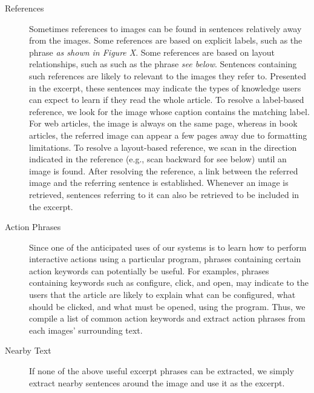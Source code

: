 \documentclass{www2010-submission}
\begin{document}
\begin{description}
\item[References] Sometimes references to images can be found in
  sentences relatively away from the images. Some references are based
  on explicit labels, such as the phrase \emph{as shown in Figure
    X}. Some references are based on layout relationships, such as
  such as the phrase \emph{see below}. Sentences containing such
  references are likely to relevant to the images they refer
  to. Presented in the excerpt, these sentences may indicate the types
  of knowledge users can expect to learn if they read the whole
  article. To resolve a label-based reference, we look for the image
  whose caption contains the matching label. For web articles, the
  image is always on the same page, whereas in book articles, the
  referred image can appear a few pages away due to formatting
  limitations. To resolve a layout-based reference, we scan in the
  direction indicated in the reference (e.g., scan backward for see
  below) until an image is found. After resolving the reference, a
  link between the referred image and the referring sentence is
  established. Whenever an image is retrieved, sentences referring to
  it can also be retrieved to be included in the excerpt.

\item[Action Phrases] Since one of the anticipated uses of our systems
  is to learn how to perform interactive actions using a particular
  program, phrases containing certain action keywords can potentially
  be useful. For examples, phrases containing keywords such as
  configure, click, and open, may indicate to the users that the
  article are likely to explain what can be configured, what should be
  clicked, and what must be opened, using the program. Thus, we
  compile a list of common action keywords and extract action phrases
  from each images' surrounding text.

\item[Nearby Text] If none of the above useful excerpt phrases can be
  extracted, we simply extract nearby sentences around the image and
  use it as the excerpt.


\end{description}
\end{document}
